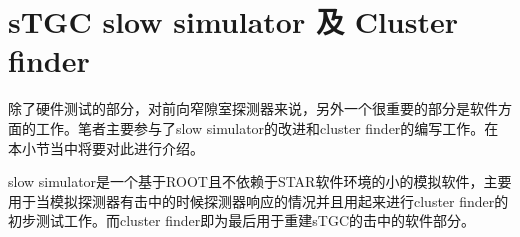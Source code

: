 \section{sTGC slow simulator 及 Cluster finder}

除了硬件测试的部分，对前向窄隙室探测器来说，另外一个很重要的部分是软件方面的工作。笔者主要参与了slow simulator的改进和cluster finder的编写工作。在本小节当中将要对此进行介绍。

slow simulator是一个基于ROOT且不依赖于STAR软件环境的小的模拟软件，主要用于当模拟探测器有击中的时候探测器响应的情况并且用起来进行cluster finder的初步测试工作。而cluster finder即为最后用于重建sTGC的击中的软件部分。



